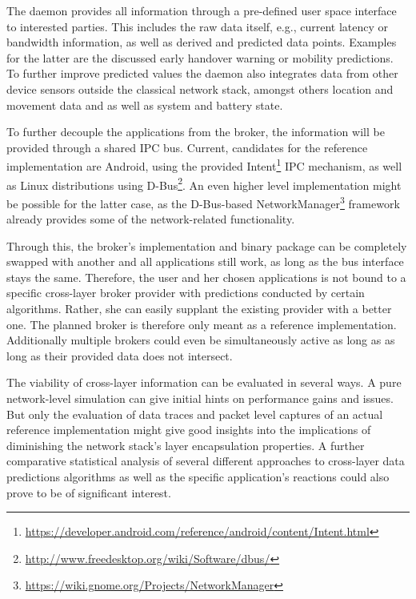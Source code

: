 The daemon provides all information through a pre-defined user space interface to interested parties. This includes the raw data itself, e.g., current latency or bandwidth information, as well as derived and predicted data points. Examples for the latter are the discussed early handover warning or mobility predictions. To further improve predicted values the daemon also integrates data from other device sensors outside the classical network stack, amongst others location and movement data and as well as system and battery state.

To further decouple the applications from the broker, the information will be provided through a shared \gls{IPC} bus. Current, candidates for the reference implementation are Android, using the provided Intent\footnote{\url{https://developer.android.com/reference/android/content/Intent.html}} \gls{IPC} mechanism, as well as Linux distributions using D-Bus\footnote{\url{http://www.freedesktop.org/wiki/Software/dbus/}}. An even higher level implementation might be possible for the latter case, as the D-Bus-based NetworkManager\footnote{\url{https://wiki.gnome.org/Projects/NetworkManager}} framework already provides some of the network-related functionality.

Through this, the broker's implementation and binary package can be completely swapped with another and all applications still work, as long as the bus interface stays the same. Therefore, the user and her chosen applications is not bound to a specific cross-layer broker provider with predictions conducted by certain algorithms. Rather, she can easily supplant the existing provider with a better one. The planned broker is therefore only meant as a reference implementation. Additionally multiple brokers could even be simultaneously active as long as as long as their provided data does not intersect.

The viability of cross-layer information can be evaluated in several ways. A pure network-level simulation can give initial hints on performance gains and issues. But only the evaluation of data traces and packet level captures of an actual reference implementation might give good insights into the implications of diminishing the network stack's layer encapsulation properties. A further comparative statistical analysis of several different approaches to cross-layer data predictions algorithms as well as the specific application's reactions could also prove to be of significant interest.



